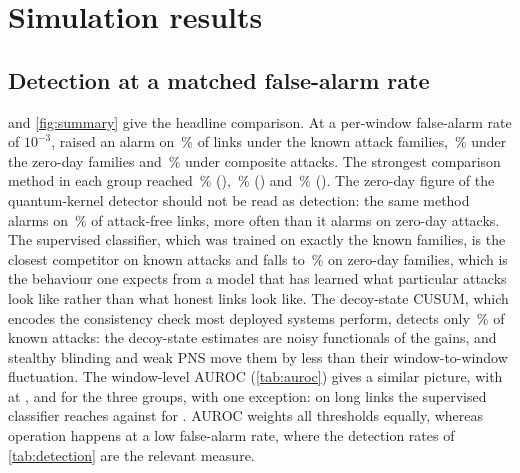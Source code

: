 \section{Simulation results}\label{sec:results}

\subsection{Detection at a matched false-alarm rate}\label{sec:res-main}

 and \cref{fig:summary} give the headline comparison. At a per-window false-alarm rate of $10^{-3}$, \qtrace{} raised an alarm on \DetKnownQT\,\% of links under the known attack families, \DetZeroDayQT\,\% under the zero-day families and \DetCompQT\,\% under composite attacks. The strongest comparison method in each group reached \DetKnownBest\,\% (\DetKnownBestName), \DetZeroDayBest\,\% (\DetZeroDayBestName) and \DetCompBest\,\% (\DetCompBestName). The zero-day figure of the quantum-kernel detector should not be read as detection: the same method alarms on \FAHonestQKoneclassSVM\,\% of attack-free links, more often than it alarms on zero-day attacks. The supervised classifier, which was trained on exactly the known families, is the closest competitor on known attacks and falls to \DetZeroDayXGBoostsup\,\% on zero-day families, which is the behaviour one expects from a model that has learned what particular attacks look like rather than what honest links look like. The decoy-state CUSUM, which encodes the consistency check most deployed systems perform, detects only \DetKnownDecoyCUSUM\,\% of known attacks: the decoy-state estimates are noisy functionals of the gains, and stealthy blinding and weak PNS move them by less than their window-to-window fluctuation. The window-level AUROC (\cref{tab:auroc}) gives a similar picture, with \qtrace{} at \AucKnownQT, \AucZeroDayQT{} and \AucCompQT{} for the three groups, with one exception: on long links the supervised classifier reaches \AucShiftXGB{} against \AucShiftQT{} for \qtrace{}. AUROC weights all thresholds equally, whereas operation happens at a low false-alarm rate, where the detection rates of \cref{tab:detection} are the relevant measure.

\begin{table}[!tbp]
\centering
\caption{Percentage of attacked links detected, by attack group, and percentage of attack-free test links with at least one alarm (FA), at a per-window false-alarm rate of $10^{-3}$ set on validation links. ``Long links'' is the 60 to 120\,km regime absent from training. Mean\,$\pm$\,95\,\% confidence interval over \NSeeds{} held-out seeds.}
\label{tab:detection}
\small
\resizebox{\textwidth}{!}{}
\end{table}

